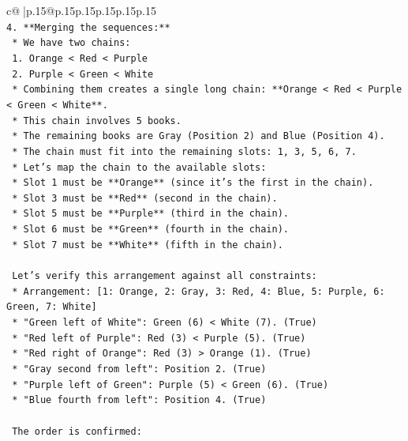 \documentclass{article}
\begin{document}
{\begin{supertabular}{c@{$\;$}|p{.15\linewidth}@{}p{.15\linewidth}p{.15\linewidth}p{.15\linewidth}p{.15\linewidth}p{.15\linewidth}}
{{{\\ 
\texttt{4.  **Merging the sequences:**} \\
\texttt{    *   We have two chains:} \\
\texttt{        1.  Orange < Red < Purple} \\
\texttt{        2.  Purple < Green < White} \\
\texttt{    *   Combining them creates a single long chain: **Orange < Red < Purple < Green < White**.} \\
\texttt{    *   This chain involves 5 books.} \\
\texttt{    *   The remaining books are Gray (Position 2) and Blue (Position 4).} \\
\texttt{    *   The chain must fit into the remaining slots: 1, 3, 5, 6, 7.} \\
\texttt{    *   Let's map the chain to the available slots:} \\
\texttt{        *   Slot 1 must be **Orange** (since it's the first in the chain).} \\
\texttt{        *   Slot 3 must be **Red** (second in the chain).} \\
\texttt{        *   Slot 5 must be **Purple** (third in the chain).} \\
\texttt{        *   Slot 6 must be **Green** (fourth in the chain).} \\
\texttt{        *   Slot 7 must be **White** (fifth in the chain).} \\
\\ 
\texttt{    Let's verify this arrangement against all constraints:} \\
\texttt{    *   Arrangement: {[}1: Orange, 2: Gray, 3: Red, 4: Blue, 5: Purple, 6: Green, 7: White{]}} \\
\texttt{    *   "Green left of White": Green (6) < White (7). (True)} \\
\texttt{    *   "Red left of Purple": Red (3) < Purple (5). (True)} \\
\texttt{    *   "Red right of Orange": Red (3) > Orange (1). (True)} \\
\texttt{    *   "Gray second from left": Position 2. (True)} \\
\texttt{    *   "Purple left of Green": Purple (5) < Green (6). (True)} \\
\texttt{    *   "Blue fourth from left": Position 4. (True)} \\
\\ 
\texttt{    The order is confirmed:} \\
}}}
\end{supertabular}}
\end{document}
